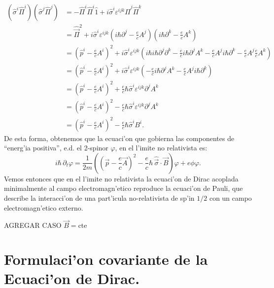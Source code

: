 \begin{align}
\left( \hat{\sigma}^i\hat{\Pi}^i\right) \left( \hat{\sigma}^{j}\hat
{\Pi}^{j}\right)  &
=-\hat{\Pi}^i\hat{\Pi}^i\hat{1}+i\hat{\sigma}^i\varepsilon^{ijk}\hat{\Pi}^
{j}\hat{\Pi}^{k}\\
& =\hat{\vec{\Pi}}^2+i\hat{\sigma}^i\varepsilon^{ijk}\left(
i\hbar\partial^{j}-\frac{e}{c}A^{j}\right) \left( 
i\hbar\partial^{k}-\frac{e}{c}A^{k}\right) \\
& =\left( \hat{p}^i-\frac{e}{c}A^i\right)
^2+i\hat{\sigma}^i\varepsilon^{ijk}\left( i\hbar
i\hbar\partial^{j}\partial^{k}-\frac{e}{c}i\hbar\partial^{j}A^{k}-\frac{e}{c}A^{
j}i\hbar\partial^{k}-\frac{e}{c}A^{j}\frac{e}{c}A^{k}\right) \\
& =\left( 
\hat{p}^i-\frac{e}{c}A^i\right)^2+i\hat{\sigma}^i\varepsilon^{ijk}\left(
 -\frac{e}{c}i\hbar\partial^{j}A^{k}-\frac{e}{c}A^{j}i\hbar\partial^{k}\right) 
\\
& =\left( \hat{p}^i-\frac{e}{c}A^i\right)^2+\frac{e}{c}\hbar
\hat{\sigma}^i\varepsilon^{ijk}\partial^{j}A^{k}\\
& =\left( \hat{p}^i-\frac{e}{c}A^i\right)^2-\frac{e}{c}\hbar
\hat{\sigma}^i\varepsilon^{ijk}\partial^{j}A^{k}\\
& =\left( 
\hat{p}^i-\frac{e}{c}A^i\right)^2-\frac{e}{c}\hbar\hat{\sigma}^iB^i.
\end{align}
De esta forma, obtenemos que la ecuaci'on que gobierna las componentes de
``energ'ia positiva'', e.d. el 2-spinor $\varphi$, en el l'imite no
relativista es:
\begin{equation}
i\hbar\,\partial_{t}\varphi=\frac{1}{2m}\left( \left( \vec{p}-\frac
{e}{c}\vec{A}\right)^2-\frac{e}{c}\hbar\,\hat{\vec{\sigma}}\cdot\vec{B}\right)
\varphi+e\phi\varphi .
\end{equation}
Vemos entonces que en el l'imite no relativista la ecuaci'on de Dirac acoplada
minimalmente al campo electromagn'etico reproduce la ecuaci'on de Pauli,
que describe la interacci'on de una part'icula no-relativista de sp'in $1/2$ con
un campo electromagn'etico externo. 

\begin{center}
AGREGAR CASO $\vec{B}=$cte
\end{center}

\section{Formulaci'on covariante de la Ecuaci'on de Dirac.}

